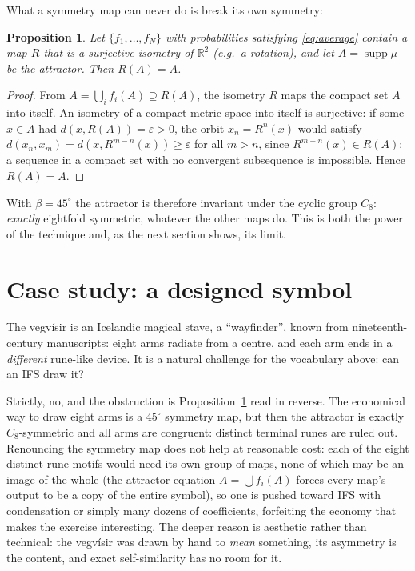 \documentclass[11pt,a4paper]{article}
\newtheorem{proposition}[theorem]{Proposition}
\theoremstyle{remark}
\newcommand{\R}{\mathbb{R}}
\begin{document}
What a symmetry map can never do is break its own symmetry:

\begin{proposition}
\label{prop:symmetry}
Let $\{f_1,\dots,f_N\}$ with probabilities satisfying \eqref{eq:average}
contain a map $R$ that is a surjective isometry of $\R^2$ (e.g.\ a
rotation), and let $A = \operatorname{supp}\mu$ be the attractor. Then
$R(A) = A$.
\end{proposition}

\begin{proof}
From $A = \bigcup_i f_i(A) \supseteq R(A)$, the isometry $R$ maps the
compact set $A$ into itself. An isometry of a compact metric space into
itself is surjective: if some $x \in A$ had $d(x, R(A)) = \varepsilon > 0$,
the orbit $x_n = R^n(x)$ would satisfy $d(x_n, x_m) = d(x, R^{m-n}(x)) \ge
\varepsilon$ for all $m > n$, since $R^{m-n}(x) \in R(A)$; a sequence in a
compact set with no convergent subsequence is impossible. Hence
$R(A) = A$.
\end{proof}

With $\beta = 45^\circ$ the attractor is therefore invariant under the cyclic
group $C_8$: \emph{exactly} eightfold symmetric, whatever the other maps
do. This is both the power of the technique and, as the next section shows,
its limit.

\section{Case study: a designed symbol}
\label{sec:vegvisir}

The vegvísir is an Icelandic magical stave, a ``wayfinder'', known from
nineteenth-century manuscripts: eight arms radiate from a centre, and each
arm ends in a \emph{different} rune-like device. It is a natural challenge
for the vocabulary above: can an IFS draw it?

Strictly, no, and the obstruction is Proposition~\ref{prop:symmetry} read in
reverse. The economical way to draw eight arms is a $45^\circ$ symmetry map, but
then the attractor is exactly $C_8$-symmetric and all arms are congruent:
distinct terminal runes are ruled out. Renouncing the symmetry map does not
help at reasonable cost: each of the eight distinct rune motifs would need
its own group of maps, none of which may be an image of the whole (the
attractor equation $A = \bigcup f_i(A)$ forces every map's output to be a
copy of the entire symbol), so one is pushed toward IFS with condensation or
simply many dozens of coefficients, forfeiting the economy that makes the
exercise interesting. The deeper reason is aesthetic rather than technical:
the vegvísir was drawn by hand to \emph{mean} something, its asymmetry is
the content, and exact self-similarity has no room for it.
\end{document}
